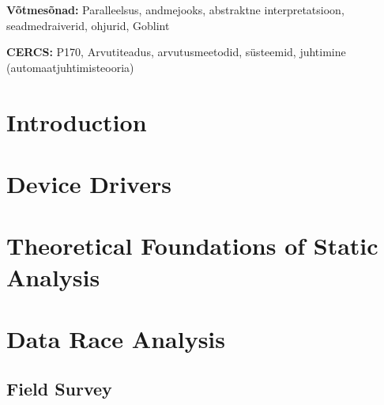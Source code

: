 \documentclass{style/master-thesis}
\begin{document}
\begin{flushleft}
  \textbf{Võtmesõnad:} Paralleelsus, andmejooks, abstraktne interpretatsioon, seadmedraiverid, ohjurid, Goblint
\end{flushleft}
\vspace*{3ex}

\noindent\textbf{CERCS:} P170, Arvutiteadus, arvutusmeetodid, süsteemid, juhtimine (automaatjuhtimisteooria)

\newpage




\tableofcontents



\section{Introduction}


\pagebreak

\section{Device Drivers}
\label{sec:device-drivers}


\pagebreak


\section{Theoretical Foundations of Static Analysis}
\label{sec:static-analysis}


\pagebreak

\section{Data Race Analysis}
\label{sec:data-races}


\subsection{Field Survey}


\pagebreak


%
\end{document}
